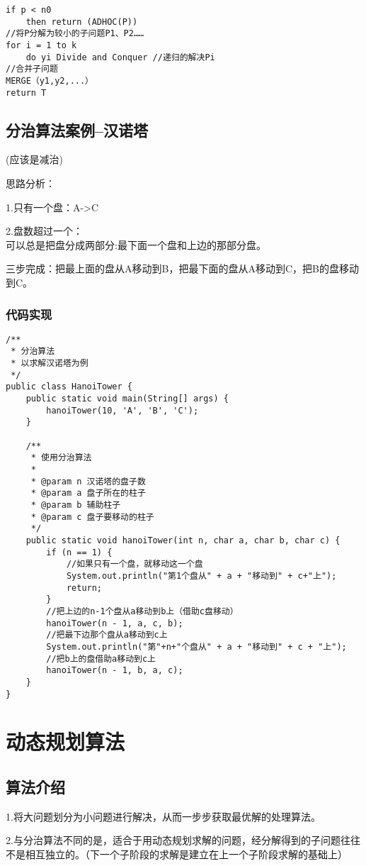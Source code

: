 \documentclass[a4paper]{report}
\begin{document}
\begin{lstlisting}
if p < n0
    then return (ADHOC(P))
//将P分解为较小的子问题P1、P2……
for i = 1 to k
    do yi Divide and Conquer //递归的解决Pi
//合并子问题
MERGE（y1,y2,...）
return T
\end{lstlisting}

\subsection{分治算法案例--汉诺塔}
(应该是减治)

思路分析：

1.只有一个盘：A->C

2.盘数超过一个：\\
可以总是把盘分成两部分:最下面一个盘和上边的那部分盘。

三步完成：把最上面的盘从A移动到B，把最下面的盘从A移动到C，把B的盘移动到C。
\subsubsection{代码实现}
\begin{lstlisting}
/**
 * 分治算法
 * 以求解汉诺塔为例
 */
public class HanoiTower {
    public static void main(String[] args) {
        hanoiTower(10, 'A', 'B', 'C');
    }

    /**
     * 使用分治算法
     *
     * @param n 汉诺塔的盘子数
     * @param a 盘子所在的柱子
     * @param b 辅助柱子
     * @param c 盘子要移动的柱子
     */
    public static void hanoiTower(int n, char a, char b, char c) {
        if (n == 1) {
            //如果只有一个盘，就移动这一个盘
            System.out.println("第1个盘从" + a + "移动到" + c+"上");
            return;
        }
        //把上边的n-1个盘从a移动到b上（借助c盘移动）
        hanoiTower(n - 1, a, c, b);
        //把最下边那个盘从a移动到c上
        System.out.println("第"+n+"个盘从" + a + "移动到" + c + "上");
        //把b上的盘借助a移动到c上
        hanoiTower(n - 1, b, a, c);
    }
}
\end{lstlisting}
\section{动态规划算法}
\subsection{算法介绍}
1.将大问题划分为小问题进行解决，从而一步步获取最优解的处理算法。

2.与分治算法不同的是，适合于用动态规划求解的问题，经分解得到的子问题往往不是相互独立的。（下一个子阶段的求解是建立在上一个子阶段求解的基础上）
\end{document}
